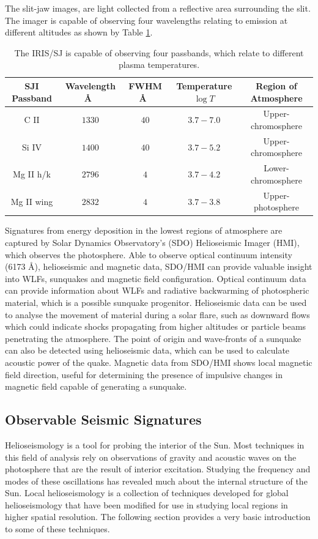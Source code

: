 The slit-jaw images, are light collected from a reflective area surrounding the slit. The imager is capable of observing four wavelengths relating to emission at different altitudes as shown by Table \ref{iris-sj}.

\begin{table}[H]
\centering
\begin{tabular}{|c|c|c|c|c|}
SJI Passband & Wavelength \AA\ & FWHM \AA\ & Temperature $\log{T}$ & Region of Atmosphere\\
\hline
C II  & $1330$ & $40$ & $3.7 - 7.0$ & Upper-chromosphere\\
Si IV  & $1400$ & $40$ & $3.7 - 5.2$ & Upper-chromosphere\\
Mg II h/k & $2796$ & $4$ & $3.7 - 4.2$ & Lower-chromosphere\\
Mg II wing & $2832$ & $4$ & $3.7 - 3.8$ & Upper-photosphere\\
\end{tabular}
\caption{The IRIS/SJ is capable of observing four passbands, which relate to different plasma temperatures.}\label{iris-sj}
\end{table}

Signatures from energy deposition in the lowest regions of atmosphere are captured by Solar Dynamics Observatory's (SDO) Helioseismic Imager (HMI), which observes the photosphere. Able to observe optical continuum intensity (6173 \AA), helioseismic and magnetic data, SDO/HMI can provide valuable insight into WLFs, sunquakes and magnetic field configuration. Optical continuum data can provide information about WLFs and radiative backwarming of photospheric material, which is a possible sunquake progenitor. Helioseismic data can be used to analyse the movement of material during a solar flare, such as downward flows which could indicate shocks propagating from higher altitudes or particle beams penetrating the atmosphere. The point of origin and wave-fronts of a sunquake can also be detected using helioseismic data, which can be used to calculate acoustic power of the quake. Magnetic data from SDO/HMI shows local magnetic field direction, useful for determining the presence of impulsive changes in magnetic field capable of generating a sunquake.



\subsection{Observable Seismic Signatures}
Helioseismology is a tool for probing the interior of the Sun. Most techniques in this field of analysis rely on observations of gravity and acoustic waves on the photosphere that are the result of interior excitation. Studying the frequency and modes of these oscillations has revealed much about the internal structure of the Sun. Local helioseismology is a collection of techniques developed for global helioseismology that have been modified for use in studying local regions in higher spatial resolution. The following section provides a very basic introduction to some of these techniques.

